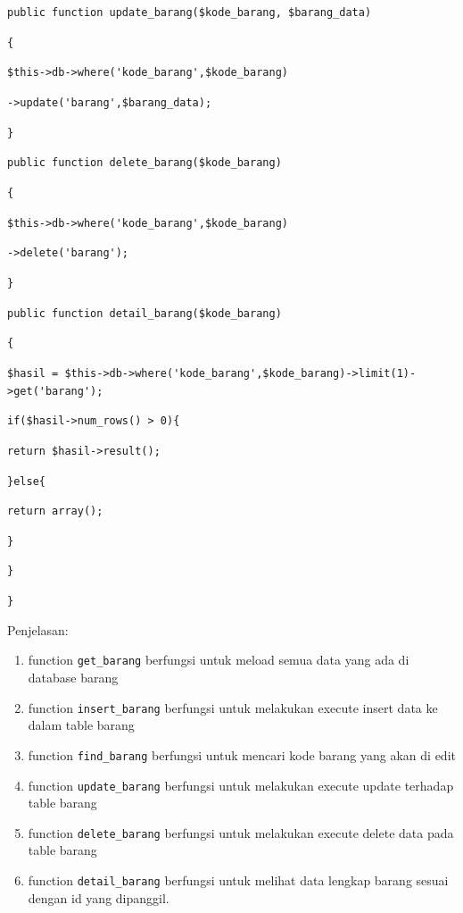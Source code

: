 \begin{enumerate}
\begin{enumerate}
            \verb|public function update_barang($kode_barang, $barang_data)|\par
            \verb|{|\par
            \verb|$this->db->where('kode_barang',$kode_barang)|\par
            \verb|->update('barang',$barang_data);|\par
            \verb|}|\par
            	
            \verb|public function delete_barang($kode_barang)|\par
            \verb|{|\par
            \verb|$this->db->where('kode_barang',$kode_barang)|\par
            \verb|->delete('barang');|\par
            \verb|}|\par
            
            \verb|public function detail_barang($kode_barang)|\par
            \verb|{|\par
            \verb|$hasil = $this->db->where('kode_barang',$kode_barang)->limit(1)->get('barang');|\par
            \verb|if($hasil->num_rows() > 0){|\par
            \verb|return $hasil->result();|\par
            \verb|}else{|\par
            \verb|return array();|\par
            \verb|}|\par
            \verb|}|\par
            \verb|}|\par

        \par Penjelasan:
        \begin{enumerate}
            \item function \verb|get_barang| berfungsi untuk meload semua data yang ada di database barang
            \item function \verb|insert_barang| berfungsi untuk melakukan execute insert data ke dalam table barang
            \item function \verb|find_barang| berfungsi untuk mencari kode barang yang akan di edit
            \item function \verb|update_barang| berfungsi untuk melakukan execute update terhadap table barang
            \item function \verb|delete_barang| berfungsi untuk melakukan execute delete data pada table barang
            \item function \verb|detail_barang| berfungsi untuk melihat data lengkap barang sesuai dengan id yang dipanggil.
            

\end{enumerate}
\end{enumerate}
\end{enumerate}
